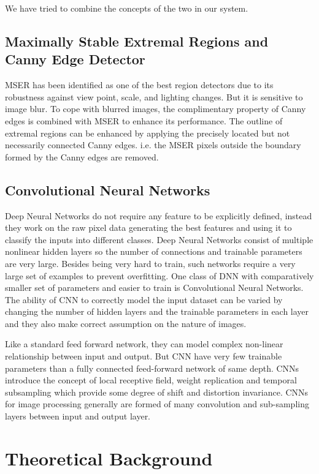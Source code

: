 We have tried to combine the concepts of the two in our system. 
    \subsection{Maximally Stable Extremal Regions and Canny Edge Detector}
    
MSER has been identified as one of the best region detectors due to its robustness against view point, scale, and lighting changes. But it is sensitive to image blur. To cope with blurred images, the complimentary property of Canny edges is combined with MSER to enhance its performance. The outline of extremal regions can be enhanced by applying the precisely located but not necessarily connected Canny edges. i.e. the MSER pixels outside the boundary formed by the Canny edges are removed.

    \subsection{Convolutional Neural Networks}
Deep Neural Networks do not require any feature to be explicitly defined, instead they work on the raw pixel data generating the best features and using it to classify the inputs into different classes. Deep Neural Networks consist of multiple nonlinear hidden layers so the number of connections and trainable parameters are very large. Besides being very hard to train, such networks require a very large set of examples to prevent overfitting. One class of DNN with comparatively smaller set of parameters and easier to train is Convolutional Neural Networks. The ability of CNN to correctly model the input dataset can be varied by changing the number of hidden layers and the trainable parameters in each layer and they also make correct assumption on the nature of images. 

Like a standard feed forward network, they can model complex non-linear relationship between input and output. But CNN have very few trainable parameters than a fully connected feed-forward network of same depth. CNNs introduce the concept of local receptive field, weight replication and temporal subsampling which provide some degree of shift and distortion invariance. CNNs for image processing generally are formed of many convolution and sub-sampling layers between input and output layer.


\section{Theoretical Background}
